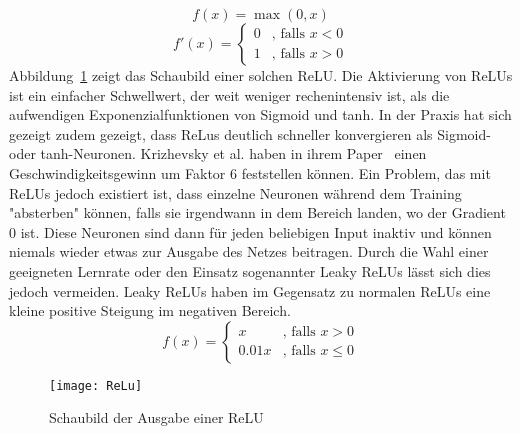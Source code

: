 \begin{equation}
	f(x) = \max(0, x)
\end{equation}
\begin{equation*}
	f'(x) = \begin{cases}
	0 &\text{, falls $x < 0$}\\
	1 &\text{, falls $x > 0$}
	\end{cases}
\end{equation*}
	Abbildung~\ref{reluoutput} zeigt das Schaubild einer solchen ReLU. 
	Die Aktivierung von ReLUs ist ein einfacher Schwellwert, der weit weniger rechenintensiv ist, als die aufwendigen Exponenzialfunktionen von Sigmoid und tanh.
	In der Praxis hat sich gezeigt zudem gezeigt, dass ReLus deutlich schneller konvergieren als Sigmoid- oder tanh-Neuronen.  
	Krizhevsky et al. haben in ihrem Paper~\cite{NIPS2012_4824} einen Geschwindigkeitsgewinn um Faktor 6 feststellen können.
	Ein Problem, das mit ReLUs jedoch existiert ist, dass einzelne Neuronen während dem Training "absterben" können, falls sie irgendwann in dem Bereich landen, wo der Gradient 0 ist.
	Diese Neuronen sind dann für jeden beliebigen Input inaktiv und können niemals wieder etwas zur Ausgabe des Netzes beitragen.
	Durch die Wahl einer geeigneten Lernrate oder den Einsatz sogenannter Leaky ReLUs lässt sich dies jedoch vermeiden.
	Leaky ReLUs haben im Gegensatz zu normalen ReLUs eine kleine positive Steigung im negativen Bereich.
	\begin{equation}
		f(x) = \begin{cases}
			x &\text{, falls } x  >  0\\
			0.01 x &\text{, falls } x  \leq  0
		\end{cases}
	\end{equation} 
	

	\begin{figure}[h]
		\centering
		\texttt{[image: ReLu]}
		\caption{Schaubild der Ausgabe einer ReLU}
		\label{reluoutput}
	\end{figure}




